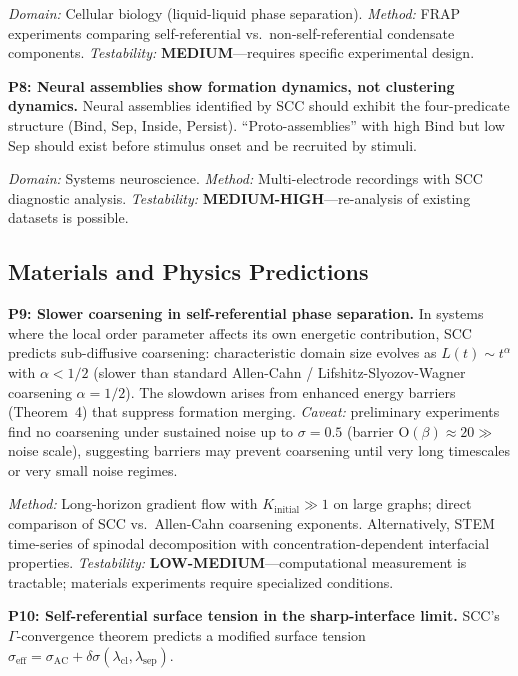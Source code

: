 \documentclass[lettersize,journal]{IEEEtran}
\begin{document}
\emph{Domain:} Cellular biology (liquid-liquid phase separation). \emph{Method:} FRAP experiments comparing self-referential vs.\ non-self-referential condensate components. \emph{Testability:} \textbf{MEDIUM}---requires specific experimental design.

\textbf{P8: Neural assemblies show formation dynamics, not clustering dynamics.} Neural assemblies identified by SCC should exhibit the four-predicate structure (Bind, Sep, Inside, Persist). ``Proto-assemblies'' with high Bind but low Sep should exist before stimulus onset and be recruited by stimuli.

\emph{Domain:} Systems neuroscience. \emph{Method:} Multi-electrode recordings with SCC diagnostic analysis. \emph{Testability:} \textbf{MEDIUM-HIGH}---re-analysis of existing datasets is possible.

\subsection{Materials and Physics Predictions}

\textbf{P9: Slower coarsening in self-referential phase separation.} In systems where the local order parameter affects its own energetic contribution, SCC predicts sub-diffusive coarsening: characteristic domain size evolves as $L(t) \sim t^\alpha$ with $\alpha < 1/2$ (slower than standard Allen-Cahn / Lifshitz-Slyozov-Wagner coarsening $\alpha = 1/2$). The slowdown arises from enhanced energy barriers (Theorem~4) that suppress formation merging. \emph{Caveat:} preliminary experiments find no coarsening under sustained noise up to $\sigma = 0.5$ (barrier O$(\beta) \approx 20 \gg$ noise scale), suggesting barriers may prevent coarsening until very long timescales or very small noise regimes.

\emph{Method:} Long-horizon gradient flow with $K_{\mathrm{initial}} \gg 1$ on large graphs; direct comparison of SCC vs.\ Allen-Cahn coarsening exponents. Alternatively, STEM time-series of spinodal decomposition with concentration-dependent interfacial properties. \emph{Testability:} \textbf{LOW-MEDIUM}---computational measurement is tractable; materials experiments require specialized conditions.

\textbf{P10: Self-referential surface tension in the sharp-interface limit.} SCC's $\Gamma$-convergence theorem predicts a modified surface tension $\sigma_{\mathrm{eff}} = \sigma_{\mathrm{AC}} + \delta\sigma(\lambda_{\mathrm{cl}}, \lambda_{\mathrm{sep}})$.
\end{document}

